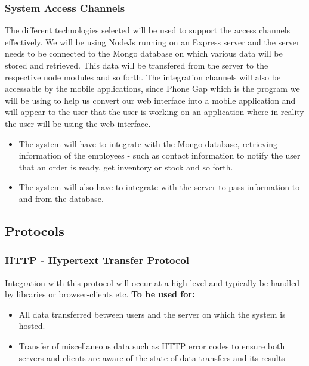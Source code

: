 \documentclass[a4paper,12pt]{article}
\begin{document}
\subsubsection{System Access Channels}
The different technologies selected will be used to support the access channels effectively. We will be using NodeJs running on an Express server and the server needs to be connected to the Mongo database on which various data will be stored and retrieved. This data will be transfered from the server to the respective node modules and so forth. 
The integration channels will also be accessable by the mobile applications, since Phone Gap which is the program we will be using to help us convert our web interface into a mobile application and will appear to the user that the user is working on an application where in reality the user will be using the web interface. 

\begin{itemize}

\item The system will have to integrate with the Mongo database, retrieving information of the employees - such as contact information to notify the user that an order is ready, get inventory or stock and so forth. 

\item The system will also have to integrate with the server to pass information to and from the database.
\end{itemize}

\subsection{Protocols}
\subsubsection{HTTP - Hypertext Transfer Protocol}
Integration with this protocol will occur at a high level and typically be handled by libraries or browser-clients etc.
\textbf{To be used for:	}
	\begin{itemize}
	\item{All data transferred between users and the server on which the system is hosted.}
	\item{Transfer of miscellaneous data such as HTTP error codes to ensure both servers and clients are aware of the state of data transfers and its results}
	\end{itemize}
	
\end{document}
